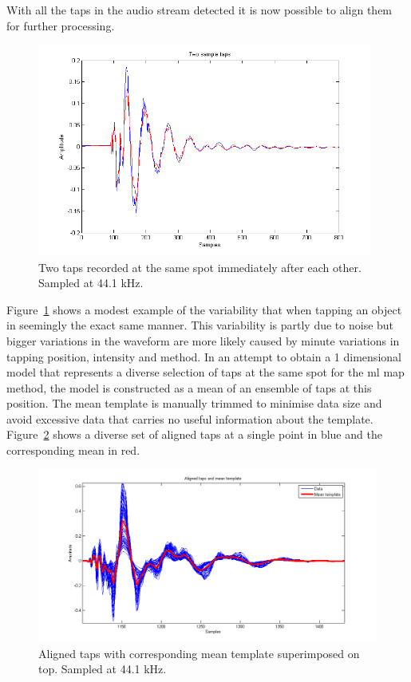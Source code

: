 With all the taps in the audio stream detected it is now possible to align them for further processing.

\begin{figure}[!]
\centering
\includegraphics[width=110mm]{twoSampleTaps.png}
\caption{Two taps recorded at the same spot immediately after each other. Sampled at 44.1 kHz.}\label{fig:twoSampleTaps}
\end{figure}

Figure~\ref{fig:twoSampleTaps} shows a modest example of the variability that \DIFdelbegin {}\DIFdelend \DIFaddbegin {}\DIFaddend when tapping an object in seemingly the exact same manner. This variability is partly due to noise but bigger variations in the waveform are more likely caused by minute variations in tapping position, intensity and method. In an attempt to obtain a 1 dimensional model that represents a diverse selection of taps at the same spot for the \DIFdelbegin {}\DIFdelend \DIFaddbegin \gls{ml} \gls{map} \DIFaddend method, the model is constructed as a mean of an ensemble of taps at this position. The mean template is manually trimmed to minimise data size and avoid excessive data that carries no useful information about the template. Figure~\ref{fig:alignedAndMean} shows a diverse set of aligned taps at a single point in blue and the corresponding mean in red.

\begin{figure}[!]
\centering
\includegraphics[width=150mm]{alignedAndMean.png}
\caption{Aligned taps with corresponding mean template superimposed on top. Sampled at 44.1 kHz.}\label{fig:alignedAndMean}
\end{figure}

